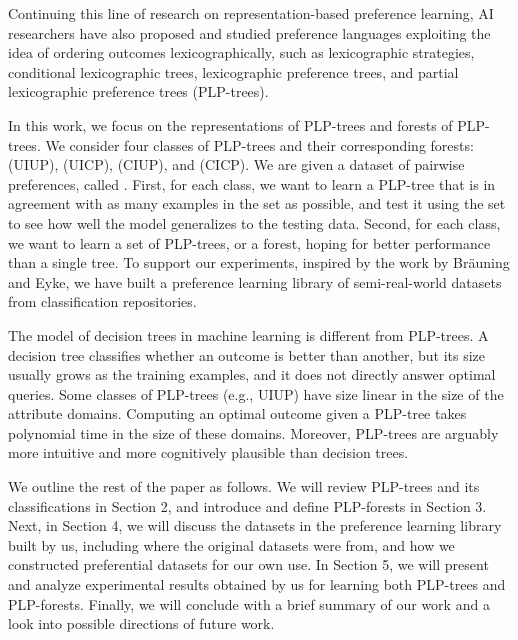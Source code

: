 Continuing this line of research on representation-based
preference learning,
AI researchers have also proposed and studied preference languages 
exploiting the idea of ordering
outcomes lexicographically,
such as lexicographic strategies\cite{schmitt2006complexity},
conditional lexicographic trees\cite{brauning2012learning},
lexicographic preference trees\cite{booth:learningLP}, and
partial lexicographic preference trees (PLP-trees)\cite{conf/aaai15/LiuT}.

In this work, we focus on the representations of PLP-trees and forests of PLP-trees.
We consider four classes of PLP-trees and their corresponding forests:
 (UIUP), 
 (UICP), 
 (CIUP), and
 (CICP).
We are given a dataset of pairwise preferences, called .
First, for each class, we want to learn a PLP-tree that is in agreement
with as many examples in the  set as possible,
and test it using the  set to see how well
the model generalizes to the testing data.
Second, for each class, we want to learn a set of PLP-trees, or a forest,
hoping for better performance than a single tree.
To support our experiments,
inspired by the work by Br{\"a}uning and Eyke\cite{brauning2012learning},
we have built a preference learning library of semi-real-world
datasets from classification repositories.

The model of decision trees
in machine learning is different from PLP-trees.
A decision tree classifies whether an outcome is better than another,
but its size usually grows as the training examples, and it does not
directly answer optimal queries.
Some classes of PLP-trees (e.g., UIUP) have size linear
in the size of the attribute domains.
Computing an optimal outcome given a PLP-tree
takes polynomial time in the size of these domains.
Moreover, PLP-trees are arguably more intuitive and 
more cognitively plausible than decision trees.


We outline the rest of the paper as follows.
We will review PLP-trees and its classifications in Section 2,
and introduce and define PLP-forests in Section 3.
Next, in Section 4, we will discuss the datasets in the 
preference learning library built by us, including where the original 
datasets were from, and how we constructed
preferential datasets for our own use.
In Section 5, we will present and analyze experimental
results obtained by us for learning both
PLP-trees and PLP-forests.
Finally, we will conclude with a brief summary of our work
and a look into possible directions of future work.


